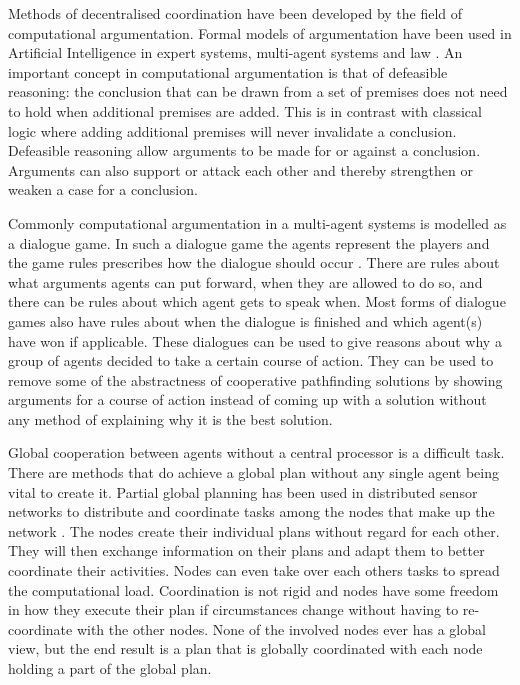 Methods of decentralised coordination have been developed by the field of 
computational argumentation. Formal models of argumentation have been used in 
Artificial Intelligence in expert systems, multi-agent systems and law
\cite{vaneemeren2014,rahwan2009}. An important concept in computational 
argumentation is that of
defeasible reasoning: the conclusion that can be drawn from a set of premises
does not need to hold when additional premises are added. This is in contrast
with classical logic where adding additional premises will never invalidate a
conclusion. Defeasible reasoning allow arguments to be made for or against a
conclusion. Arguments can also support or attack each other and thereby
strengthen or weaken a case for a conclusion.

Commonly computational argumentation in a multi-agent systems is modelled as a 
dialogue game.
In such a dialogue game the agents represent the players and the game rules
prescribes how the dialogue should occur \cite{walton1995}. There are rules
about what arguments agents can put forward, when they are allowed to do so,
and there can be rules about which agent gets to speak when. Most forms of
dialogue games also have rules about when the dialogue is finished and which
agent(s) have won if applicable. These dialogues can be used to give reasons
about why a group of agents decided to take a certain course of action. They
can be used to remove some of the abstractness of cooperative pathfinding
solutions by showing arguments for a course of action instead of coming up with
a solution without any method of explaining why it is the best solution.

Global cooperation between agents without a central processor is a difficult 
task. There are methods that do achieve a global plan without any single agent 
being vital to create it.
Partial global planning has been used in distributed sensor networks to
distribute and coordinate tasks among the nodes that make up the network
\cite{durfee1991}. The nodes create their individual plans without regard for
each other. They will then exchange information on their plans and adapt them
to better coordinate their activities. Nodes can even take over each others
tasks to spread the computational load. Coordination is not rigid and nodes have
some freedom in how they execute their plan if circumstances change without
having to re-coordinate with the other nodes. None of the involved nodes ever
has a global view, but the end result is a plan that is globally coordinated
with each node holding a part of the global plan.


